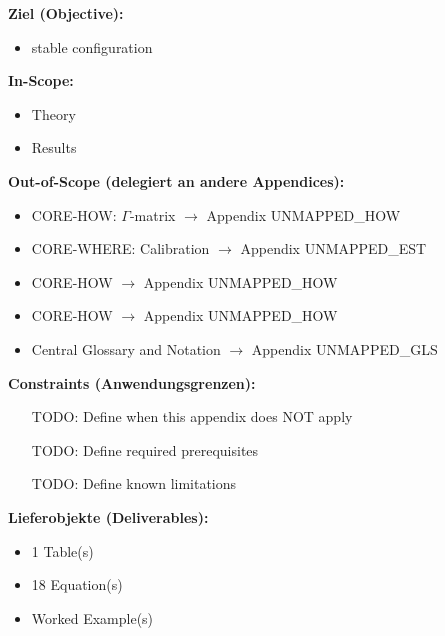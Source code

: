 %
%
%
%
%


\begin{tcolorbox}[
    colback=orange!5!white,
    colframe=orange!75!black,
    title={\textbf{Appendix Scope: Ziel / In-Scope / Out-of-Scope / Constraints}},
    fonttitle=\bfseries
]

\textbf{Ziel (Objective):}
\begin{itemize}[nosep]
    \item stable configuration
\end{itemize}

\textbf{In-Scope:}
\begin{itemize}[nosep]
    \item Theory
    \item Results
\end{itemize}

\textbf{Out-of-Scope (delegiert an andere Appendices):}
\begin{itemize}[nosep]
    \item CORE-HOW: $\Gamma$-matrix $\rightarrow$ Appendix UNMAPPED_HOW
    \item CORE-WHERE: Calibration $\rightarrow$ Appendix UNMAPPED_EST
    \item CORE-HOW $\rightarrow$ Appendix UNMAPPED_HOW
    \item CORE-HOW $\rightarrow$ Appendix UNMAPPED_HOW
    \item Central Glossary and Notation $\rightarrow$ Appendix UNMAPPED_GLS
\end{itemize}

\textbf{Constraints (Anwendungsgrenzen):}
\begin{itemize}[nosep]
    \item [TODO: Define when this appendix does NOT apply]
    \item [TODO: Define required prerequisites]
    \item [TODO: Define known limitations]
\end{itemize}

\textbf{Lieferobjekte (Deliverables):}
\begin{itemize}[nosep]
    \item 1 Table(s)
    \item 18 Equation(s)
    \item Worked Example(s)
\end{itemize}

\end{tcolorbox}



